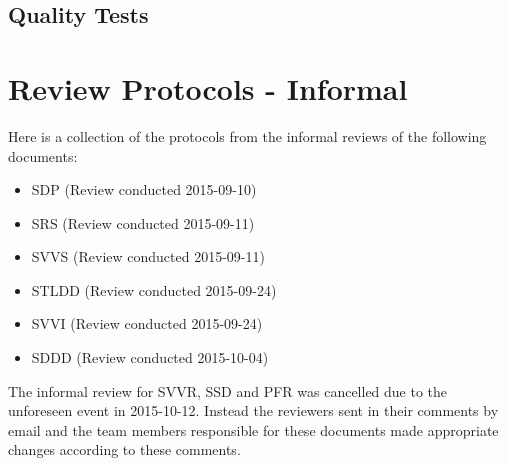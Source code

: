 \documentclass[a4paper]{article}
\begin{document}
\subsection{Quality Tests}




\newpage
\section{Review Protocols - Informal}
Here is a collection of the protocols from the informal reviews of the following documents:

\begin{itemize}
\item SDP (Review conducted 2015-09-10)
\item SRS (Review conducted 2015-09-11)
\item SVVS (Review conducted 2015-09-11)
\item STLDD (Review conducted 2015-09-24)
\item SVVI (Review conducted 2015-09-24)
\item SDDD (Review conducted 2015-10-04)
\end{itemize}

The informal review for SVVR, SSD and PFR was cancelled due to the unforeseen event in 2015-10-12. Instead the reviewers sent in their comments by email and the team members responsible for these documents made appropriate changes according to these comments.  











\end{document}
